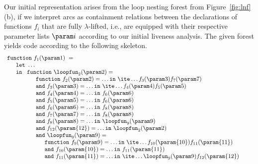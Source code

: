 Our initial representation arises from the loop nesting forest from
Figure~\ref{fig:lnf}(b), if we interpret arcs as containment
relations between the declarations of functions $f_i$ that are fully
$\lambda$-lifted, i.e., are equipped with their respective parameter
lists $\param i$ according to our initial liveness analysis. The given
forest yields code according to the following skeleton.
\begin{equation}
\label{FunctionalLoopNest1}
\begin{array}{l}
\mathtt{function}\ f_1(\param 1)\ = \\
  \quad
  \begin{array}{l}
     \mathtt{let}\ \ldots  \\
     \mathtt{in}\ 
     \begin{array}[t]{l}
       \mathtt{function}\ \loopfun_2 (\param 2) =  \\
       \quad \begin{array}[t]{l}
               \mathtt{function}\ f_2(\param 2) = \ldots \mathtt{in}\ \ite \ldots {f_3(\param 3)} {f_7(\param 7)}\\
               \mathtt{and}\ f_3(\param 3) = \ldots \mathtt{in}\ \ite \ldots {f_4(\param 4)} {f_5(\param 5)}\\
               \mathtt{and}\ f_4(\param 4) = \ldots \mathtt{in}\ f_6(\param 6)\\
               \mathtt{and}\ f_5(\param 5) = \ldots \mathtt{in}\ f_6(\param 6)\\
               \mathtt{and}\ f_6(\param 6) = \ldots \mathtt{in}\ f_8(\param 8)\\
               \mathtt{and}\ f_7(\param 7) = \ldots \mathtt{in}\ f_8(\param 8)\\
               \mathtt{and}\ f_8(\param 8) = \ldots \mathtt{in}\ \loopfun_9(\param 9)\\
               \mathtt{and}\ f_{12}(\param {12}) = \ldots \mathtt{in}\ \loopfun_2(\param 2)\\
               \mathtt{and}\ \loopfun_9 (\param 9) =  \\
                    \quad \begin{array}[t]{l}
                             \mathtt{function}\ f_9(\param 9) = \ldots \mathtt{in}\ \ite \ldots {f_{10}(\param {10})} {f_{11}(\param{11})}\\
                             \mathtt{and}\ f_{10}(\param {10}) = \ldots \mathtt{in}\ f_{11}(\param{11})\\
                             \mathtt{and}\ f_{11}(\param {11}) = \ldots \mathtt{in}\ \ite \ldots {\loopfun_9(\param 9)} {f_{12}(\param{12})}\\

\end{array}
\end{array}
\end{array}
\end{array}
\end{array}
\end{equation}
